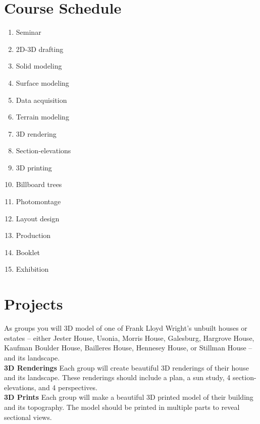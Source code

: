 \documentclass[11pt,article,oneside]{memoir}
\begin{document}
\section{Course Schedule}

\begin{multicols}{3}
\begin{enumerate}[label=\textbf{\arabic*}]
%
\item Seminar
\item 2D-3D drafting
\item Solid modeling
\item Surface modeling
\item Data acquisition
\item Terrain modeling
\item 3D rendering
\item Section-elevations
\item 3D printing
\item Billboard trees
\item Photomontage
\item Layout design
\item Production
%
\item Booklet
\item Exhibition
%
\end{enumerate}
\end{multicols}


\section{Projects}
As groups %
you will 3D model of one of 
Frank Lloyd Wright's unbuilt houses or estates
-- either Jester House, Usonia, Morris House, Galesburg, 
Hargrove House, Kaufman Boulder House, Bailleres House, 
Hennesey House, or Stillman House -- 
and its landscape.\\

\noindent \textbf{3D Renderings}
Each group will create beautiful 3D renderings
of their house and its landscape. 
These renderings should include 
a plan,
a sun study, 
4 section-elevations, 
and 4 perspectives.\\

\noindent \textbf{3D Prints}
Each group will make a beautiful 3D printed model 
of their building and its topography.
The model should be printed in multiple parts
to reveal sectional views.\\
\end{document}
